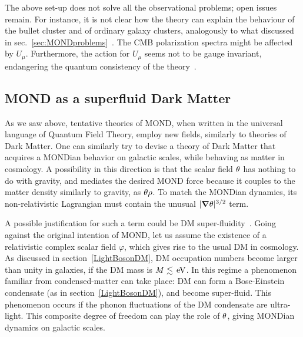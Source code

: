 The above set-up does not solve all the observational problems; open issues remain.
For instance, it is not clear how the theory can explain the behaviour of the bullet cluster 
and of ordinary galaxy clusters, analogously to what discussed in sec.~\ref{sec:MONDproblems}~\cite{MONDfailuresandsuccesses}.
The CMB polarization spectra might be affected by $U_\mu$. Furthermore, the 
action for $U_\mu$ seems not to be gauge invariant, endangering the quantum consistency of the theory~\cite{MONDth}.


\medskip

\subsection{MOND as a superfluid Dark Matter}\label{superfluidDM}
As we saw above, tentative theories of MOND, when written in the universal language of
Quantum Field Theory, employ new fields, similarly to theories of Dark Matter.
One can similarly try to devise a theory of Dark Matter that acquires a MONDian behavior on galactic scales,
while behaving as matter in cosmology.
A  possibility in this direction is that the scalar field $\theta$ has nothing to do with gravity,
and mediates the desired MOND force because  it couples to the matter density similarly to gravity, as $\theta \rho$.
To match the MONDian dynamics, its non-relativistic Lagrangian must contain the unusual $|\bm{\nabla}\theta|^{3/2}$ term.

A possible justification for such a term could  be DM super-fluidity~\cite{DMsuperfluid}.
Going against the original intention of MOND, let us assume the existence of a relativistic complex scalar field $\varphi$,
which gives rise to the usual DM in cosmology.
As discussed in section~\ref{LightBosonDM}, DM occupation numbers become larger than unity
in galaxies, if the DM mass is $M\lesssim \,{\rm eV}$.
In this regime a phenomenon familiar from condensed-matter can take place: 
DM can form a Bose-Einstein condensate (as in section~\ref{LightBosonDM}), and become super-fluid.
This phenomenon occurs if the phonon fluctuations of the DM condensate are ultra-light.
This composite degree of freedom can play the role of $\theta$, giving MONDian dynamics on galactic scales.

